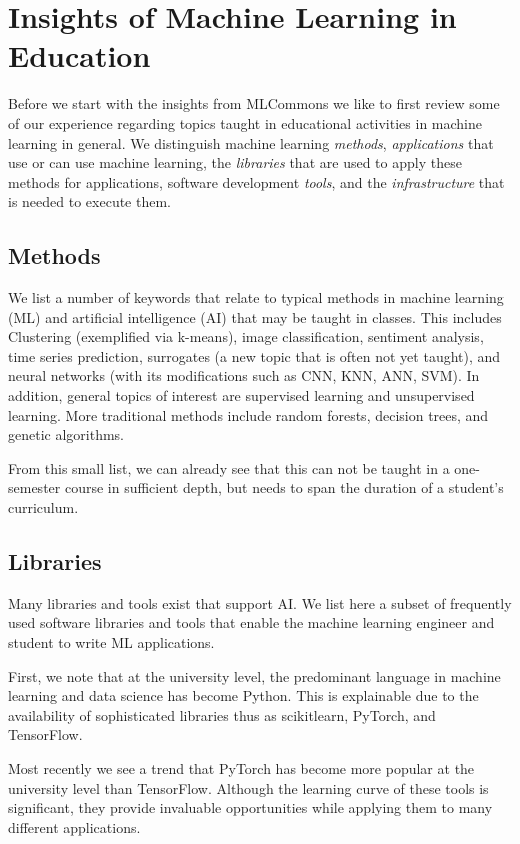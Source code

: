 \documentclass[utf8]{FrontiersinVancouver} %
\begin{document}
\section{Insights of Machine Learning in Education}
\label{sec:edu-ml}

Before we start with the insights from MLCommons we like to first
review some of our experience regarding topics taught in educational
activities in machine learning in general.  We distinguish machine
learning {\em methods}, {\em applications} that use or can use machine
learning, the {\em libraries} that are used to apply these methods for
applications, software development {\em tools}, and the {\em
  infrastructure} that is needed to execute them.

\subsection{Methods}

We list a number of keywords that relate to typical methods in machine
learning (ML) and artificial intelligence (AI) that may be taught in
classes. This includes Clustering (exemplified via k-means), image
classification, sentiment analysis, time series prediction, surrogates
(a new topic that is often not yet taught), and neural networks (with
its modifications such as CNN, KNN, ANN, SVM).  In addition, general
topics of interest are supervised learning and unsupervised learning.
More traditional methods include random forests, decision trees, and
genetic algorithms.

From this small list, we can already see that this can not be taught
in a one-semester course in sufficient depth, but needs to span the
duration of a student's curriculum.

\subsection{Libraries}

Many libraries and tools exist that support AI.  We list here a subset
of frequently used software libraries and tools that enable the
machine learning engineer and student to write ML applications.

First, we note that at the university level, the predominant language
in machine learning and data science has become Python. This is
explainable due to the availability of sophisticated libraries thus as
scikitlearn, PyTorch, and TensorFlow.

Most recently we see a trend that PyTorch has become more popular at
the university level than TensorFlow.  Although the learning curve of
these tools is significant, they provide invaluable opportunities
while applying them to many different applications.
\end{document}
